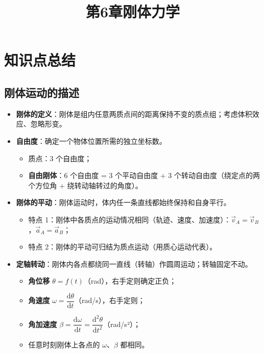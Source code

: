 \documentclass[12pt,a4paper]{ctexart}
\title{第6章\quad 刚体力学}
\author{}
\date{}
\begin{document}
\maketitle

\section{知识点总结}

\subsection{刚体运动的描述}

\begin{itemize}
    \item \textbf{刚体的定义}：刚体是组内任意两质点间的距离保持不变的质点组；考虑体积效应、忽略形变。
    \item \textbf{自由度}：确定一个物体位置所需的独立坐标数。
    \begin{itemize}
        \item 质点：3 个自由度；
        \item \textbf{自由刚体}：6 个自由度 = 3 个平动自由度 + 3 个转动自由度（绕定点的两个方位角 + 绕转动轴转过的角度）。
    \end{itemize}
    \item \textbf{刚体的平动}：刚体运动时，体内任一条直线都始终保持和自身平行。
    \begin{itemize}
        \item 特点 1：刚体中各质点的运动情况相同（轨迹、速度、加速度）：$\vec{v}_A = \vec{v}_B$，$\vec{a}_A = \vec{a}_B$；
        \item 特点 2：刚体的平动可归结为质点运动（用质心运动代表）。
    \end{itemize}
    \item \textbf{定轴转动}：刚体内各点都绕同一直线（转轴）作圆周运动；转轴固定不动。
    \begin{itemize}
        \item \textbf{角位移} $\theta = f(t)$（rad），右手定则确定正负；
        \item \textbf{角速度} $\omega = \dfrac{\mathrm{d}\theta}{\mathrm{d}t}$（rad/s），右手定则；
        \item \textbf{角加速度} $\beta = \dfrac{\mathrm{d}\omega}{\mathrm{d}t} = \dfrac{\mathrm{d}^2\theta}{\mathrm{d}t^2}$（rad/s²）；
        \item 任意时刻刚体上各点的 $\omega$、$\beta$ 都相同。
    \end{itemize}

\end{itemize}
\end{document}
